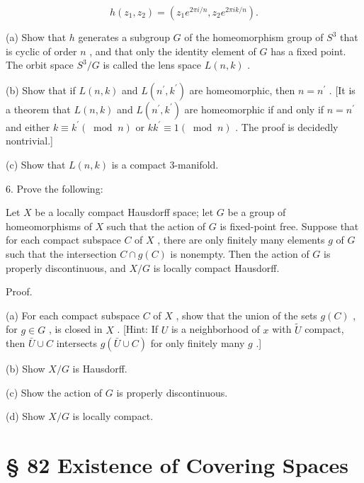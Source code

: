\[
h\left( {{z}_{1},{z}_{2}}\right)  = \left( {{z}_{1}{e}^{{2\pi i}/n},{z}_{2}{e}^{{2\pi ik}/n}}\right) .
\]

(a) Show that \(h\) generates a subgroup \(G\) of the homeomorphism group of \({S}^{3}\) that is cyclic of order \(n\) , and that only the identity element of \(G\) has a fixed point. The orbit space \({S}^{3}/G\) is called the lens space \(L\left( {n,k}\right)\) .

(b) Show that if \(L\left( {n,k}\right)\) and \(L\left( {{n}^{\prime },{k}^{\prime }}\right)\) are homeomorphic, then \(n = {n}^{\prime }\) . [It is a theorem that \(L\left( {n,k}\right)\) and \(L\left( {{n}^{\prime },{k}^{\prime }}\right)\) are homeomorphic if and only if \(n = {n}^{\prime }\) and either \(k \equiv  {k}^{\prime }\left( {\;\operatorname{mod}\;n}\right)\) or \(k{k}^{\prime } \equiv  1\left( {\;\operatorname{mod}\;n}\right)\) . The proof is decidedly nontrivial.]

(c) Show that \(L\left( {n,k}\right)\) is a compact 3-manifold.

6. Prove the following:

\begin{theorem} Let \(X\) be a locally compact Hausdorff space; let \(G\) be a group of homeomorphisms of \(X\) such that the action of \(G\) is fixed-point free. Suppose that for each compact subspace \(C\) of \(X\) , there are only finitely many elements \(g\) of \(G\) such that the intersection \(C \cap  g\left( C\right)\) is nonempty. Then the action of \(G\) is properly discontinuous, and \(X/G\) is locally compact Hausdorff.
\end{theorem}

Proof.

(a) For each compact subspace \(C\) of \(X\) , show that the union of the sets \(g\left( C\right)\) , for \(g \in  G\) , is closed in \(X\) . [Hint: If \(U\) is a neighborhood of \(x\) with \(\widetilde{U}\) compact, then \(\bar{U} \cup  C\) intersects \(g\left( {\bar{U} \cup  C}\right)\) for only finitely many \(g\) .]

(b) Show \(X/G\) is Hausdorff.

(c) Show the action of \(G\) is properly discontinuous.

(d) Show \(X/G\) is locally compact.

\section*{§ 82 Existence of Covering Spaces}

